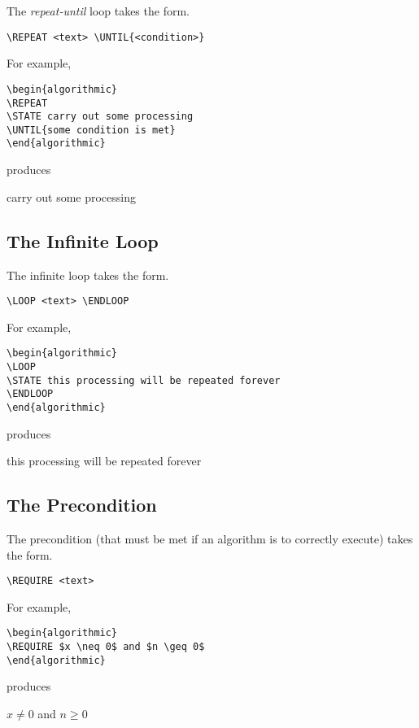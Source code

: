 \documentclass{article}
\begin{document}
The {\em repeat-until} loop takes the form.
\begin{verbatim}
\REPEAT <text> \UNTIL{<condition>}
\end{verbatim}
For example,
\begin{verbatim}
\begin{algorithmic}
\REPEAT
\STATE carry out some processing 
\UNTIL{some condition is met}
\end{algorithmic}
\end{verbatim}
produces
\begin{algorithmic}
\REPEAT
\STATE carry out some processing 
\end{algorithmic}

\subsection{The Infinite Loop}

The infinite loop takes the form.
\begin{verbatim}
\LOOP <text> \ENDLOOP
\end{verbatim}
For example,
\begin{verbatim}
\begin{algorithmic}
\LOOP
\STATE this processing will be repeated forever
\ENDLOOP
\end{algorithmic}
\end{verbatim}
produces
\begin{algorithmic}
\LOOP
\STATE this processing will be repeated forever
\ENDLOOP
\end{algorithmic}

\subsection{The Precondition}

The precondition (that must be met if an algorithm is to correctly
execute) takes the form.
\begin{verbatim}
\REQUIRE <text>
\end{verbatim}
For example,
\begin{verbatim}
\begin{algorithmic}
\REQUIRE $x \neq 0$ and $n \geq 0$
\end{algorithmic}
\end{verbatim}
produces
\begin{algorithmic}
\REQUIRE $x \neq 0$ and $n \geq 0$
\end{algorithmic}
\end{document}
